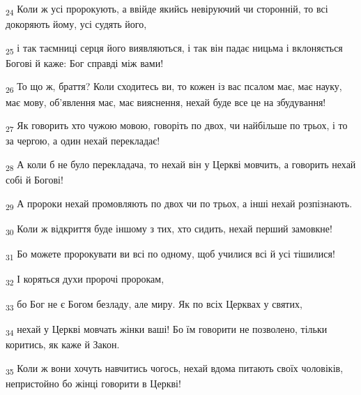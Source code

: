 \begin{tcolorbox}
\textsubscript{24} Коли ж усі пророкують, а ввійде якийсь невіруючий чи сторонній, то всі докоряють йому, усі судять його,
\end{tcolorbox}
\begin{tcolorbox}
\textsubscript{25} і так таємниці серця його виявляються, і так він падає ницьма і вклоняється Богові й каже: Бог справді між вами!
\end{tcolorbox}
\begin{tcolorbox}
\textsubscript{26} То що ж, браття? Коли сходитесь ви, то кожен із вас псалом має, має науку, має мову, об'явлення має, має вияснення, нехай буде все це на збудування!
\end{tcolorbox}
\begin{tcolorbox}
\textsubscript{27} Як говорить хто чужою мовою, говоріть по двох, чи найбільше по трьох, і то за чергою, а один нехай перекладає!
\end{tcolorbox}
\begin{tcolorbox}
\textsubscript{28} А коли б не було перекладача, то нехай він у Церкві мовчить, а говорить нехай собі й Богові!
\end{tcolorbox}
\begin{tcolorbox}
\textsubscript{29} А пророки нехай промовляють по двох чи по трьох, а інші нехай розпізнають.
\end{tcolorbox}
\begin{tcolorbox}
\textsubscript{30} Коли ж відкриття буде іншому з тих, хто сидить, нехай перший замовкне!
\end{tcolorbox}
\begin{tcolorbox}
\textsubscript{31} Бо можете пророкувати ви всі по одному, щоб училися всі й усі тішилися!
\end{tcolorbox}
\begin{tcolorbox}
\textsubscript{32} І коряться духи пророчі пророкам,
\end{tcolorbox}
\begin{tcolorbox}
\textsubscript{33} бо Бог не є Богом безладу, але миру. Як по всіх Церквах у святих,
\end{tcolorbox}
\begin{tcolorbox}
\textsubscript{34} нехай у Церкві мовчать жінки ваші! Бо їм говорити не позволено, тільки коритись, як каже й Закон.
\end{tcolorbox}
\begin{tcolorbox}
\textsubscript{35} Коли ж вони хочуть навчитись чогось, нехай вдома питають своїх чоловіків, непристойно бо жінці говорити в Церкві!
\end{tcolorbox}
